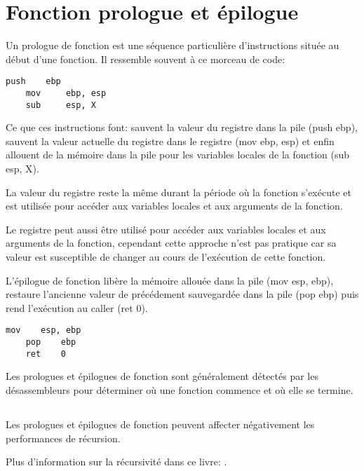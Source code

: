 \section{Fonction prologue et épilogue}
\label{sec:prologepilog}

Un prologue de fonction est une séquence particulière d'instructions située au début d'une fonction. Il ressemble souvent à ce morceau de code:

\begin{lstlisting}[style=customasmx86]
    push    ebp
    mov     ebp, esp
    sub     esp, X
\end{lstlisting}

Ce que ces instructions font: sauvent la valeur du registre \EBP dans la pile (push ebp), sauvent la valeur actuelle du registre \ESP dans le
 registre \EBP (mov ebp, esp) et enfin allouent de la mémoire dans la pile pour les variables locales de la fonction (sub esp, X).

La valeur du registre \EBP reste la même durant la période où la fonction s'exécute et est utilisée pour accéder aux variables locales et aux arguments de la fonction.

Le registre \ESP peut aussi être utilisé pour accéder aux variables locales et aux arguments de la fonction, cependant cette approche n'est
 pas pratique car sa valeur est susceptible de changer au cours de l'exécution de cette fonction.

L'épilogue de fonction libère la mémoire allouée dans la pile (mov esp, ebp), restaure l'ancienne valeur de \EBP précédement sauvegardée dans la pile (pop ebp) puis rend l'exécution au \gls{caller} (ret 0).

\begin{lstlisting}[style=customasmx86]
    mov    esp, ebp
    pop    ebp
    ret    0
\end{lstlisting}

Les prologues et épilogues de fonction sont généralement détectés par les désassembleurs pour déterminer où une fonction commence et où elle se termine.

\subsection{\Recursion}

\myindex{\Recursion}
Les prologues et épilogues de fonction peuvent affecter négativement les performances de récursion.

Plus d'information sur la récursivité dans ce livre: .
